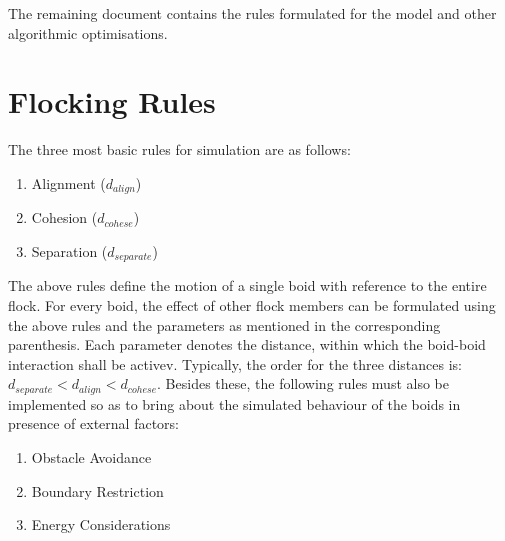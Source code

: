 \documentclass[12pt]{report}
\begin{document}
The remaining document contains the rules formulated for the model and other algorithmic optimisations.






\newpage
\section*{Flocking Rules}
The three most basic rules for simulation are as follows:
\begin{enumerate}
\item Alignment ($d_{align}$)
\item Cohesion ($d_{cohese}$)
\item Separation ($d_{separate}$)
\end{enumerate}
The above rules define the motion of a single boid with reference to the entire flock.
For every boid, the effect of other flock members can be formulated using the above rules and the parameters as mentioned in the corresponding parenthesis.  
\newline
Each parameter denotes the distance, within which the boid-boid interaction shall be activev. Typically, the order for the three distances is:  $d_{separate} < d_{align} < d_{cohese}$.
\newline
Besides these, the following rules must also be implemented so as to bring about the simulated behaviour of the boids in presence of external factors:
\begin{enumerate}
\item Obstacle Avoidance
\item Boundary Restriction
\item Energy Considerations
\end{enumerate}
\end{document}
